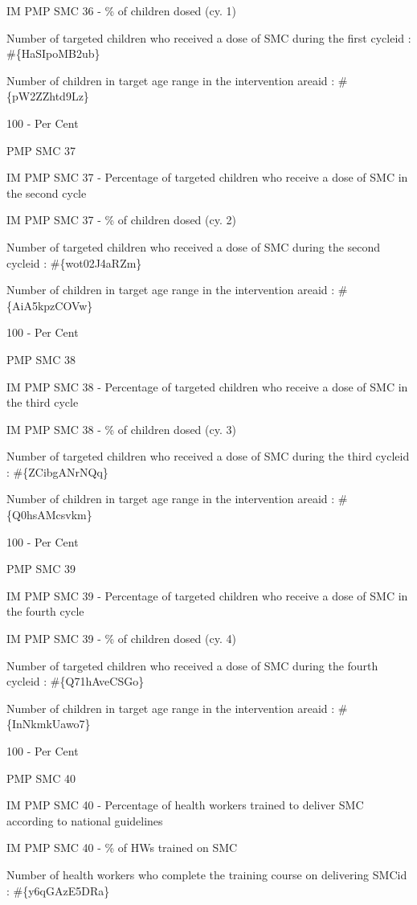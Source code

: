 \documentclass[]{book}
\begin{document}
IM PMP SMC 36 - \% of children dosed (cy. 1)

Number of targeted children who received a dose of SMC during the first cycleid : \#\{HaSIpoMB2ub\}

Number of children in target age range in the intervention areaid : \#\{pW2ZZhtd9Lz\}

100 - Per Cent

PMP SMC 37

IM PMP SMC 37 - Percentage of targeted children who receive a dose of SMC in the second cycle

IM PMP SMC 37 - \% of children dosed (cy. 2)

Number of targeted children who received a dose of SMC during the second cycleid : \#\{wot02J4aRZm\}

Number of children in target age range in the intervention areaid : \#\{AiA5kpzCOVw\}

100 - Per Cent

PMP SMC 38

IM PMP SMC 38 - Percentage of targeted children who receive a dose of SMC in the third cycle

IM PMP SMC 38 - \% of children dosed (cy. 3)

Number of targeted children who received a dose of SMC during the third cycleid : \#\{ZCibgANrNQq\}

Number of children in target age range in the intervention areaid : \#\{Q0hsAMcsvkm\}

100 - Per Cent

PMP SMC 39

IM PMP SMC 39 - Percentage of targeted children who receive a dose of SMC in the fourth cycle

IM PMP SMC 39 - \% of children dosed (cy. 4)

Number of targeted children who received a dose of SMC during the fourth cycleid : \#\{Q71hAveCSGo\}

Number of children in target age range in the intervention areaid : \#\{InNkmkUawo7\}

100 - Per Cent

PMP SMC 40

IM PMP SMC 40 - Percentage of health workers trained to deliver SMC according to national guidelines

IM PMP SMC 40 - \% of HWs trained on SMC

Number of health workers who complete the training course on delivering SMCid : \#\{y6qGAzE5DRa\}
\end{document}
